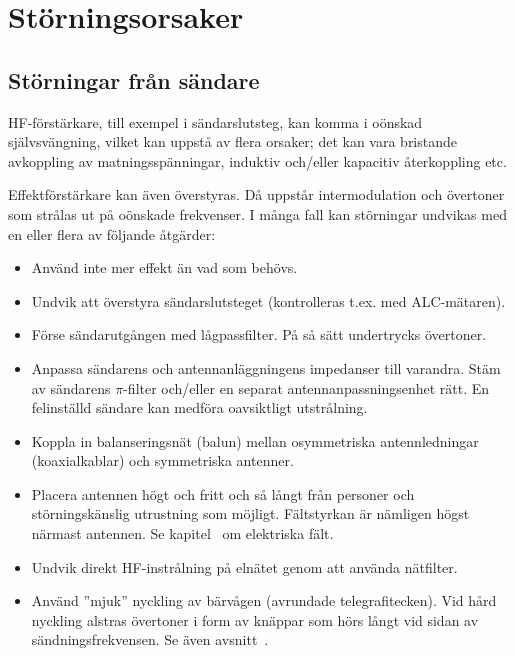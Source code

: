 \section{Störningsorsaker}
\label{sec:storningsorsaker}

\subsection{Störningar från sändare}

HF-förstärkare, till exempel i sändarslutsteg, kan komma i oönskad självsvängning,
vilket kan uppstå av flera orsaker; det kan vara bristande avkoppling av
matningsspänningar, induktiv och/eller kapacitiv återkoppling etc.

Effektförstärkare kan även överstyras.
Då uppstår intermodulation och övertoner som strålas ut på oönskade frekvenser.
I många fall kan störningar undvikas med en eller flera av följande åtgärder:

\begin{itemize}
\item Använd inte mer effekt än vad som behövs.
\item Undvik att överstyra sändarslutsteget (kontrolleras t.ex. med
  ALC-mätaren).
\item Förse sändarutgången med lågpassfilter.
  På så sätt undertrycks övertoner.
\item Anpassa sändarens och antennanläggningens impedanser till varandra.
  Stäm av sändarens \(\pi\)-filter och/eller en separat antennanpassningsenhet
  rätt.
  En felinställd sändare kan medföra oavsiktligt utstrålning.
\item Koppla in balanseringsnät (balun) mellan osymmetriska antennledningar
  (koaxialkablar) och symmetriska antenner.
\item Placera antennen högt och fritt och så långt från personer och
  störningskänslig utrustning som möjligt.
  Fältstyrkan är nämligen högst närmast antennen.
  Se kapitel~ om elektriska fält.
\item Undvik direkt HF-instrålning på elnätet genom att använda nätfilter.
\item Använd ''mjuk'' nyckling av bärvågen (avrundade telegrafitecken).
  Vid hård nyckling alstras övertoner i form av knäppar som hörs långt vid
  sidan av sändningsfrekvensen. Se även avsnitt~.
\end{itemize}

